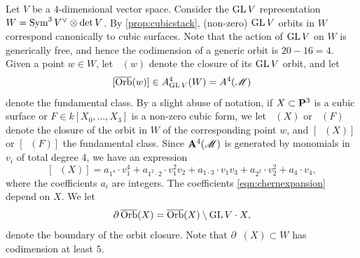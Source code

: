 \documentclass[11pt,reqno, letterpaper]{amsart}
\DeclareMathOperator{\Orb}{\overline{Orb}}
\numberwithin{equation}{section}
\begin{document}
Let $V$ be a $4$-dimensional vector space.
Consider the $\GL V$ representation $W = \Sym^3 V^\vee \otimes \det V$.
By \autoref{prop:cubicstack}, (non-zero) $\GL V$ orbits in $W$ correspond canonically to cubic surfaces.
Note that the action of $\GL V$ on $W$ is generically free, and hence the codimension of a generic orbit is $20-16 = 4$.
Given a point $w \in W$, let $\Orb(w)$ denote the closure of its $\GL V$ orbit, and let
\[ [\Orb(w)] \in A^4_{\GL V}(W) = A^4(\mathscr M)\]
denote the fundamental class.
By a slight abuse of notation, if $X \subset \P^3$ is a cubic surface or $F \in k[X_0, \dots, X_3]$ is a non-zero cubic form, we let $\Orb(X)$ or $\Orb(F)$ denote the closure of the orbit in $W$ of the corresponding point $w$, and $[\Orb(X)]$ or $[\Orb(F)]$ the fundamental class.
Since $\A^4(\mathscr M)$ is generated by monomials in $v_i$ of total degree 4, we have an expression
\begin{equation}\label{eqn:chernexpansion}
  [\Orb(X)] = a_{1^4} \cdot v_1^4 + a_{1^2\cdot 2} \cdot v_1^2v_2 + a_{1\cdot 3} \cdot v_1v_3 + a_{2^2} \cdot v_2^2 + a_4 \cdot v_4,
\end{equation}
where the coefficients $a_i$ are integers.
The coefficients \eqref{eqn:chernexpansion} depend on $X$.
We let
\[ \partial \Orb(X) = \Orb(X) \setminus \GL V \cdot X,\]
denote the boundary of the orbit closure.
Note that $\partial \Orb(X) \subset W$ has codimension at least $5$.
\end{document}
